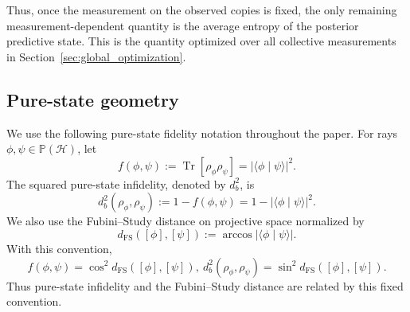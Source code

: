 \documentclass[journal]{IEEEtran}
\begin{document}
Thus, once the measurement on the observed copies is fixed, the only remaining
measurement-dependent quantity is the average entropy of the posterior
predictive state.  This is the quantity optimized over all collective measurements in
Section~\ref{sec:global_optimization}.

\subsection{Pure-state geometry}
\label{subsec:pure_state_fidelity_geometry}
We use the following pure-state fidelity notation throughout the paper.  For
rays \(\phi,\psi\in\mathbb P(\mathcal H)\), let
\begin{equation}
    f(\phi,\psi)
    :=
    \operatorname{Tr}[\rho_\phi\rho_\psi]
    =
    |\langle\phi\mid\psi\rangle|^2.
    \label{eq:pure_state_fidelity_definition}
\end{equation}
The squared pure-state infidelity, denoted by \(d_b^2\), is
\begin{equation}
    d_b^2(\rho_\phi,\rho_\psi)
    :=
    1-f(\phi,\psi)
    =
    1-|\langle\phi\mid\psi\rangle|^2.
    \label{eq:db_squared_pure_state_infidelity}
\end{equation}
We also use the Fubini--Study distance on projective space normalized by
\begin{equation}
    d_{\mathrm{FS}}([\phi],[\psi])
    :=
    \arccos |\langle\phi\mid\psi\rangle|.
    \label{eq:FS_distance_definition_global}
\end{equation}
With this convention,
\begin{equation}
    f(\phi,\psi)
    =
    \cos^2 d_{\mathrm{FS}}([\phi],[\psi]),
    ~
    d_b^2(\rho_\phi,\rho_\psi)
    =
    \sin^2 d_{\mathrm{FS}}([\phi],[\psi]).
    \label{eq:infidelity_FS_relation_global}
\end{equation}
Thus pure-state infidelity and the Fubini--Study distance are related by
this fixed convention.
\end{document}
